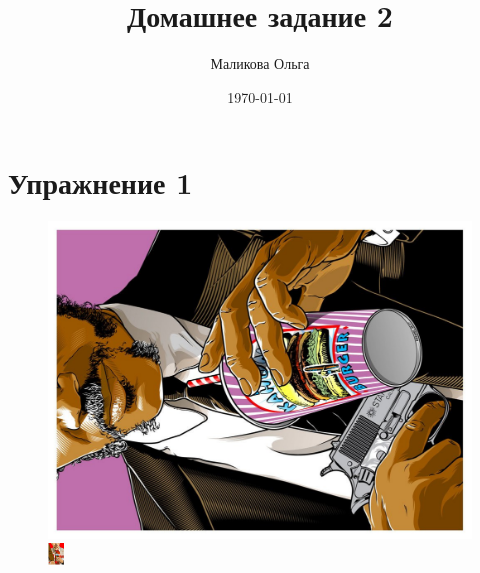 \documentclass[12pt, a4paper]{article}
\author{Маликова Ольга}
\title{Домашнее задание 2}
\date{\today}
\begin{document}
 

\maketitle

\section{Упражнение 1}

\begin{figure}[h!]
\begin{minipage}[h!]{0.3\linewidth} 
\includegraphics[width=0.82\linewidth, angle=270, scale=1.3]{pop1.pdf}
\end{minipage}
\hfill
\begin{minipage}[h!]{0.3\linewidth} 
\includegraphics[width=0.8\linewidth, height=0.21\textheight]{pop3.pdf}

\end{minipage}
\end{figure}
\end{document}
